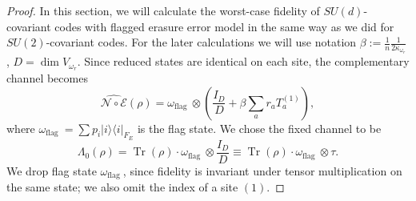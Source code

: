\documentclass[11pt,letterpaper]{article}
\theoremstyle{plain}
\theoremstyle{plain}
\theoremstyle{plain}
\theoremstyle{plain}
\theoremstyle{plain}
\theoremstyle{plain}
\theoremstyle{plain}
\theoremstyle{definition}
\theoremstyle{plain}
\begin{document}
\begin{proof}
In this section, we will calculate the worst-case fidelity of $SU(d)$-covariant codes with flagged erasure error model
in the same way as we did for $SU(2)$-covariant codes. 
For the later calculations we will use notation $\beta:=\frac{1}{n} \frac{1}{2\kappa_{\omega_r}}$, $D=\operatorname{dim} V_{\omega_r}$.
Since reduced states are identical on each site, the complementary channel becomes
\[
        \widehat{\mathcal{N} \circ \mathcal{E}}(\rho)=\omega_{\text {flag }} \otimes \left(\frac{I_D}{D}+ \beta \sum_a r_a T_a^{(1)}\right),
\]
where $\omega_{\text {flag }}=\sum p_i|i\rangle\langle i|_{F_E}$ is the flag state. We chose the fixed channel to be 
$$
\Lambda_0(\rho)=\operatorname{Tr}(\rho)\cdot \omega_{\text {flag }}\otimes \frac{I_{D}}{D} \equiv \operatorname{Tr}(\rho)\cdot \omega_{\text {flag }}\otimes \tau.
$$ 
We drop flag state $\omega_{\text {flag }}$, since fidelity is invariant under 
tensor multiplication on the same state; we also omit the index of a site $(1)$.


\end{proof}
\end{document}
